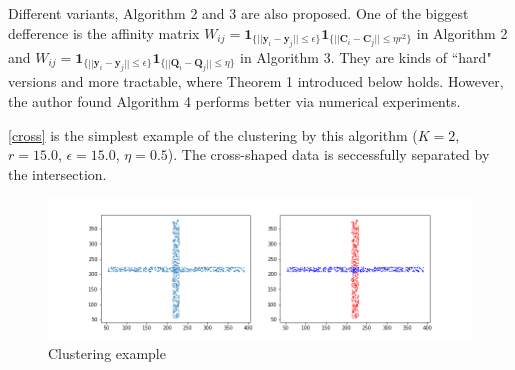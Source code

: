 Different variants, Algorithm 2 and 3 are also proposed. One of the biggest defference is the affinity matrix 
$W_{ij} = \boldsymbol{1}_{ \{ || \boldsymbol{y}_i - \boldsymbol{y}_j || \leq \epsilon \} } 
 \boldsymbol{1}_{ \{ || \boldsymbol{C}_i - \boldsymbol{C}_j || \leq \eta r^2 \}}  $ in Algorithm 2 and 
$W_{ij} = \boldsymbol{1}_{ \{ || \boldsymbol{y}_i - \boldsymbol{y}_j || \leq \epsilon \} } 
 \boldsymbol{1}_{ \{ || \boldsymbol{Q}_i - \boldsymbol{Q}_j || \leq \eta \}}  $ in Algorithm 3. 
They are kinds of ``hard" versions and more tractable, where Theorem 1 introduced below holds.
However, the author found  Algorithm 4 performs better via numerical experiments.

\autoref{cross} is the simplest example of the clustering by this algorithm ($K = 2$, $r = 15.0$, $\epsilon = 15.0$, $\eta = 0.5$).
The cross-shaped data is seccessfully separated by the intersection.

\begin{figure}[htbp]
\centering
\vspace{-1em}
\includegraphics[width=0.8  \textwidth]{cross_shaped.png}
\vspace{-1em}
\caption{Clustering example}
\label{cross}
\end{figure}


%   